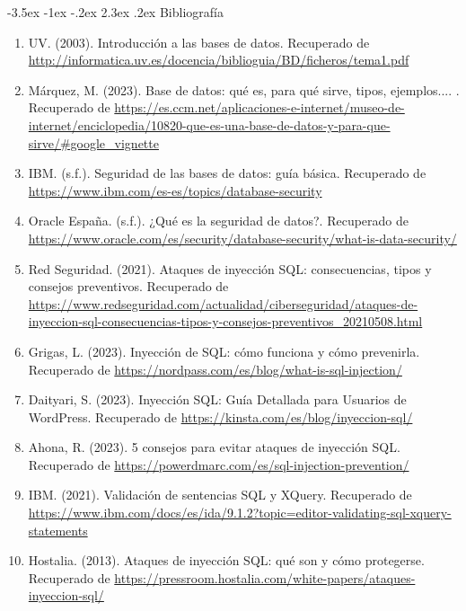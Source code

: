 \documentclass[11pt]{report}
\makeatletter
\renewcommand\chapter{\@startsection{chapter}{0}{\z@}%
    {-3.5ex \@plus -1ex \@minus -.2ex}%
    {2.3ex \@plus.2ex}%
    {\normalfont\Large\bfseries}}
\makeatother
\begin{document}
\chapter{Bibliografía}
\begin{enumerate}
\item UV. (2003). Introducción a las bases de datos. Recuperado de \url{http://informatica.uv.es/docencia/biblioguia/BD/ficheros/tema1.pdf}

\item Márquez, M. (2023). Base de datos: qué es, para qué sirve, tipos, ejemplos.... .
Recuperado de \url{https://es.ccm.net/aplicaciones-e-internet/museo-de-internet/enciclopedia/10820-que-es-una-base-de-datos-y-para-que-sirve/\#google\_vignette}

\item IBM. (s.f.). Seguridad de las bases de datos: guía básica. Recuperado de \url{https://www.ibm.com/es-es/topics/database-security}

\item Oracle España. (s.f.). ¿Qué es la seguridad de datos?. Recuperado de \url{https://www.oracle.com/es/security/database-security/what-is-data-security/}

\item Red Seguridad. (2021). Ataques de inyección SQL: consecuencias, tipos y consejos preventivos. Recuperado de \url{https://www.redseguridad.com/actualidad/ciberseguridad/ataques-de-inyeccion-sql-consecuencias-tipos-y-consejos-preventivos_20210508.html}

\item Grigas, L. (2023). Inyección de SQL: cómo funciona y cómo prevenirla. Recuperado de \url{https://nordpass.com/es/blog/what-is-sql-injection/}

\item Daityari, S. (2023). Inyección SQL: Guía Detallada para Usuarios de WordPress. Recuperado de \url{https://kinsta.com/es/blog/inyeccion-sql/}

\item Ahona, R. (2023). 5 consejos para evitar ataques de inyección SQL. Recuperado de \url{https://powerdmarc.com/es/sql-injection-prevention/}

\item IBM. (2021). Validación de sentencias SQL y XQuery. Recuperado de \url{https://www.ibm.com/docs/es/ida/9.1.2?topic=editor-validating-sql-xquery-statements}

\item Hostalia. (2013). Ataques de inyección SQL: qué son y cómo protegerse. Recuperado de \url{https://pressroom.hostalia.com/white-papers/ataques-inyeccion-sql/}


\end{enumerate}
\end{document}
